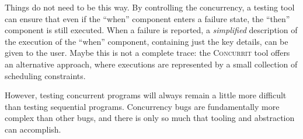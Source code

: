 Things do not need to be this way.  By controlling the concurrency, a
testing tool can ensure that even if the ``when'' component enters a
failure state, the ``then'' component is still executed.  When a
failure is reported, a \emph{simplified} description of the execution
of the ``when'' component, containing just the key details, can be
given to the user.  Maybe this is not a complete trace: the
\textsc{Concurrit} \parencite{elmas2013} tool offers an alternative
approach, where executions are represented by a small collection of
scheduling constraints.

However, testing concurrent programs will always remain a little more
difficult than testing sequential programs.  Concurrency bugs are
fundamentally more complex than other bugs, and there is only so much
that tooling and abstraction can accomplish.
